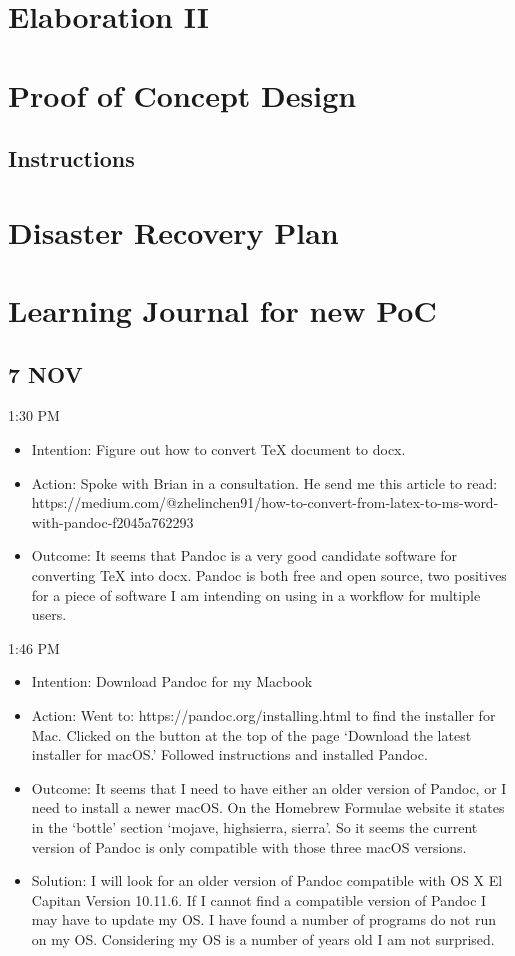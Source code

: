\documentclass{article}
\begin{document}
\section{Elaboration II}

\section{Proof of Concept Design}

\subsection{Instructions}

\section{Disaster Recovery Plan}

\section{Learning Journal for new PoC}

\subsection{7 NOV}

1:30 PM
\begin{itemize}
    \item Intention: Figure out how to convert TeX document to docx.
    \item Action: Spoke with Brian in a consultation. He send me this article to read: https://medium.com/@zhelin\-chen91/how-to-convert-from-latex-to-ms-word-with-pandoc-f2045a762293
    \item Outcome: It seems that Pandoc is a very good candidate software for converting TeX into docx. Pandoc is both free and open source, two positives for a piece of software I am intending on using in a workflow for multiple users.
\end{itemize}

1:46 PM
\begin{itemize}
    \item Intention: Download Pandoc for my Macbook
    \item Action: Went to: https://pandoc.org/installing.html to find the installer for Mac. Clicked on the button at the top of the page `Download the latest installer for macOS.' Followed instructions and installed Pandoc. 
    \item Outcome: It seems that I need to have either an older version of Pandoc, or I need to install a newer macOS. On the Homebrew Formulae website it states in the `bottle' section `mojave, high\textunderscore sierra, sierra'. So it seems the current version of Pandoc is only compatible with those three macOS versions.
    \item Solution: I will look for an older version of Pandoc compatible with OS X El Capitan Version 10.11.6. If I cannot find a compatible version of Pandoc I may have to update my OS. I have found a number of programs do not run on my OS. Considering my OS is a number of years old I am not surprised.
\end{itemize}
\end{document}
